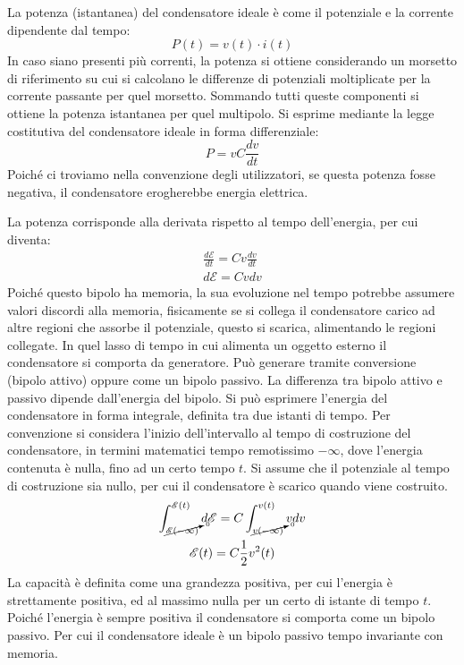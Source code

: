 \documentclass{article}
\numberwithin{equation}{subsection}
\begin{document}
La potenza (istantanea) del condensatore ideale è come il potenziale e la corrente dipendente dal tempo:
\begin{equation*}
    P(t)=v(t)\cdot i(t)
\end{equation*}
In caso siano presenti più correnti, la potenza si ottiene considerando un morsetto di riferimento su cui si calcolano le differenze di potenziali moltiplicate per la 
corrente passante per quel morsetto. Sommando tutti queste componenti si ottiene la potenza istantanea per quel multipolo. 
Si esprime mediante la legge costitutiva del condensatore ideale in forma differenziale:
\begin{equation*}
    P=vC\displaystyle\frac{dv}{dt}
\end{equation*}
Poiché ci troviamo nella convenzione degli utilizzatori, se questa potenza fosse negativa, il condensatore erogherebbe energia elettrica. 

La potenza corrisponde alla derivata rispetto al tempo dell'energia, per cui diventa:
\begin{gather*}
    \displaystyle\frac{d\mathscr{E}}{dt}=Cv\frac{dv}{dt}\\
    d\mathscr{E}=Cvdv
\end{gather*}
Poiché questo bipolo ha memoria, la sua evoluzione nel tempo potrebbe assumere valori discordi alla memoria, fisicamente se si collega il condensatore carico ad altre regioni 
che assorbe il potenziale, questo si scarica, alimentando le regioni collegate. In quel lasso di tempo in cui alimenta un oggetto esterno il condensatore si comporta da 
generatore. Può generare tramite conversione (bipolo attivo) oppure come un bipolo passivo. La differenza tra bipolo attivo e passivo dipende dall'energia del bipolo. 
Si può esprimere l'energia del condensatore in forma integrale, definita tra due istanti di tempo. Per convenzione si considera l'inizio dell'intervallo al tempo di 
costruzione del condensatore, in termini matematici tempo remotissimo $-\infty$, dove l'energia contenuta è nulla, fino ad un certo tempo $t$. Si assume che il potenziale 
al tempo di costruzione sia nullo, per cui il condensatore è scarico quando viene costruito. 
\begin{gather*}
    \displaystyle\int_{\cancelto{0}{\mathscr{E}(-\infty)}}^{\mathscr{E}(t)}d\mathscr{E}=C\int_{\cancelto{0}{v(-\infty)}}^{v(t)}vdv\\
    \mathscr{E}(t)=C\displaystyle\frac{1}{2}v^2(t)
\end{gather*}
La capacità è definita come una grandezza positiva, per cui l'energia è strettamente positiva, ed al massimo nulla per un certo di istante di tempo $t$. Poiché l'energia 
è sempre positiva il condensatore si comporta come un bipolo passivo. Per cui il condensatore ideale è un bipolo passivo tempo invariante con memoria. 
\end{document}
